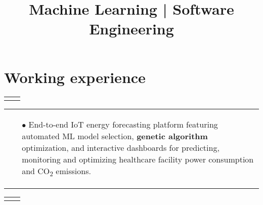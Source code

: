 \documentclass[11pt,a4paper,sans,english]{moderncv}
\title{Machine Learning | Software Engineering}
\makeatletter
\renewcommand*{\cventry}[6][.25em]{%
	\vspace{1.5mm}%
	\begin{tabular*}{\textwidth}{@{\extracolsep{\fill}}ll}%
		\ifthenelse{\equal{#3}{}}{}{\textbf{#3}} &
		\ifthenelse{\equal{#2}{}}{}{#4 #6 #2}\\%
	\end{tabular*}%
	\par\addvspace{#1}}
\newcommand*{\mycvitem}[2][.25em]{%
	\vspace{-.25em}%
	\begin{tabular}{@{}p{\textwidth}@{}}%
		\small#2%
	\end{tabular}%
	\par\addvspace{-0.7em}}
\makeatother
\begin{document}
	
	\newcommand{\jobdouble}[9]{%
		\cvdoubleitem{#3}{#1, #2, #4}{#7}{#5, #6, #8}
	}
	
	\makecvtitle
	\vspace*{-1cm} %
	
	\section{Working experience}
	\vspace*{-.15cm}
	\cventry{\scalebox{0.9}{\faCalendar\ 01/2025-- current}}{Machine Learning Engineer - Senior Consultant}{\scalebox{0.9}{\faBuilding\ \href{https://www.linksmt.it/}{\textit{Links Management \& Technology}}}}{}{\scalebox{0.9}{\faMapMarker\ Bari}}{}
		\mycvitem{%
			\begin{itemize}
				\item[$\bullet$] End-to-end IoT energy forecasting platform featuring automated ML model selection, \textbf{genetic algorithm} optimization, and interactive dashboards for predicting, monitoring and optimizing healthcare facility power consumption and CO\textsubscript{2} emissions.
			\end{itemize}
		}
	\vspace*{.25cm}
	\cventry{\scalebox{0.9}{\faCalendar\ 03/2023--12/2024}}{Machine Learning Engineer - Consultant}{\scalebox{0.9}{\faBuilding\ \href{https://www.linksmt.it/}{\textit{Links Management \& Technology}}}}{}{\scalebox{0.9}{\faMapMarker\ Bari}}{}
\end{document}
